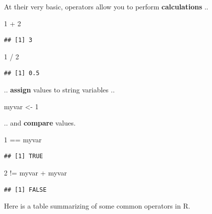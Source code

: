 \documentclass[
]{book}
\newenvironment{Shaded}{\begin{snugshade}}{\end{snugshade}}
\newcommand{\DecValTok}[1]{\textcolor[rgb]{0.00,0.00,0.81}{#1}}
\newcommand{\NormalTok}[1]{#1}
\newcommand{\OtherTok}[1]{\textcolor[rgb]{0.56,0.35,0.01}{#1}}
\newcommand{\SpecialCharTok}[1]{\textcolor[rgb]{0.00,0.00,0.00}{#1}}
\begin{document}
At their very basic, operators allow you to perform \textbf{calculations} ..

\begin{Shaded}
\begin{Highlighting}[]
\DecValTok{1} \SpecialCharTok{+} \DecValTok{2}
\end{Highlighting}
\end{Shaded}

\begin{verbatim}
## [1] 3
\end{verbatim}

\begin{Shaded}
\begin{Highlighting}[]
\DecValTok{1} \SpecialCharTok{/} \DecValTok{2}
\end{Highlighting}
\end{Shaded}

\begin{verbatim}
## [1] 0.5
\end{verbatim}

.. \textbf{assign} values to string variables ..

\begin{Shaded}
\begin{Highlighting}[]
\NormalTok{myvar }\OtherTok{\textless{}{-}} \DecValTok{1}
\end{Highlighting}
\end{Shaded}

.. and \textbf{compare} values.

\begin{Shaded}
\begin{Highlighting}[]
\DecValTok{1} \SpecialCharTok{==}\NormalTok{ myvar}
\end{Highlighting}
\end{Shaded}

\begin{verbatim}
## [1] TRUE
\end{verbatim}

\begin{Shaded}
\begin{Highlighting}[]
\DecValTok{2} \SpecialCharTok{!=}\NormalTok{ myvar }\SpecialCharTok{+}\NormalTok{ myvar}
\end{Highlighting}
\end{Shaded}

\begin{verbatim}
## [1] FALSE
\end{verbatim}

Here is a table summarizing of some common operators in R.
\end{document}
